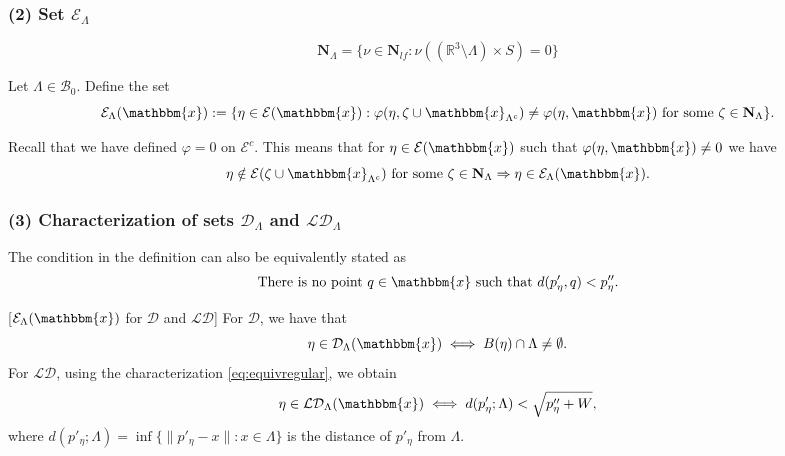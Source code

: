 \documentclass[c, 10pt]{beamer}
\newcommand{\x}{{\mathbbm{x}}}
\begin{document}
\begin{frame}[noframenumbering]\frametitle{(2) Set $\mathcal E_\Lambda$}

$$\mathbf N_\Lambda = \{ \nu \in \mathbf N_{lf}: \nu( (\mathbb R^3 \setminus \Lambda) \times S) = 0 \}$$



\begin{definition}\label{def:Eset} Let $\Lambda \in \mathcal B_0$. Define the set 
	$$\mathcal E_\Lambda(\x) := \{ \eta \in \mathcal E(\x): \varphi(\eta,\zeta \cup \x_{\Lambda^c}) \neq \varphi(\eta,\x) \text{ for some } \zeta \in \mathbf N_\Lambda \}.$$
\end{definition}

Recall that we have defined $\varphi=0$ on $\mathcal E^c$. This means that for $\eta \in \mathcal E(\x)$ such that $\varphi(\eta,\x)\neq 0$ we have
$$\eta \notin \mathcal E(\zeta \cup \x_{\Lambda^c})\text{ for some }\zeta \in \mathbf N_{\Lambda} \Rightarrow \eta \in \mathcal E_{\Lambda}(\x).$$ 

\end{frame}



\begin{frame}[noframenumbering]\frametitle{(3) Characterization of sets $\mathcal D_\Lambda$ and $\mathcal {LD}_\Lambda$}


The condition in the definition can also be equivalently stated as 
\begin{equation}\label{eq:equivregular}\text{There is no point } q\in\x \text{ such that } d(p'_\eta,q)<p''_\eta.\end{equation}

[$\mathcal E_\Lambda(\x)$ for $\mathcal D$ and $\mathcal {LD}$] 
	For $\mathcal D$, we have that 
	$$\eta \in \mathcal D_\Lambda(\x)\iff B(\eta) \cap \Lambda \neq \emptyset.$$ 
	For $\mathcal {LD}$, using the characterization \eqref{eq:equivregular}, we obtain 
	$$\eta \in \mathcal {LD}_\Lambda(\x) \iff d(p'_\eta;\Lambda) < \sqrt{p''_\eta + W},$$
	where $d(p'_\eta;\Lambda) = \inf\{\|p'_\eta - x\|: x \in \Lambda\}$ is the distance of $p'_\eta$ from $\Lambda$.    


\end{frame}
\end{document}
